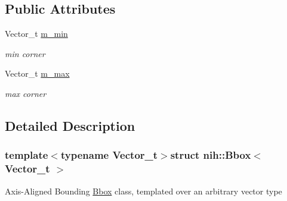 \subsection*{\-Public \-Attributes}
\begin{DoxyCompactItemize}
\item 
\hypertarget{structnih_1_1_bbox_a1d8ccda901cd9ecfe7ad40d046362936}{
\-Vector\-\_\-t \hyperlink{structnih_1_1_bbox_a1d8ccda901cd9ecfe7ad40d046362936}{m\-\_\-min}}
\label{structnih_1_1_bbox_a1d8ccda901cd9ecfe7ad40d046362936}

\begin{DoxyCompactList}\small\item\em min corner \end{DoxyCompactList}\item 
\hypertarget{structnih_1_1_bbox_acf51fbadf69955a4a12641d96b17a9b8}{
\-Vector\-\_\-t \hyperlink{structnih_1_1_bbox_acf51fbadf69955a4a12641d96b17a9b8}{m\-\_\-max}}
\label{structnih_1_1_bbox_acf51fbadf69955a4a12641d96b17a9b8}

\begin{DoxyCompactList}\small\item\em max corner \end{DoxyCompactList}\end{DoxyCompactItemize}


\subsection{\-Detailed \-Description}
\subsubsection*{template$<$typename \-Vector\-\_\-t$>$struct nih\-::\-Bbox$<$ Vector\-\_\-t $>$}

\-Axis-\/\-Aligned \-Bounding \hyperlink{structnih_1_1_bbox}{\-Bbox} class, templated over an arbitrary vector type 

